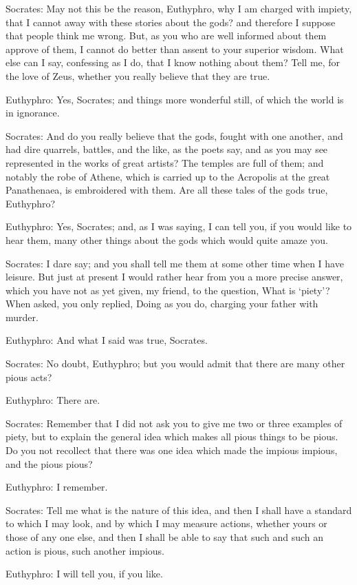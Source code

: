 Socrates: May not this be the reason, Euthyphro, why I am charged with impiety, that I cannot away with these stories about the gods? and therefore I suppose that people think me wrong. But, as you who are well informed about them approve of them, I cannot do better than assent to your superior wisdom. What else can I say, confessing as I do, that I know nothing about them? Tell me, for the love of Zeus, whether you really believe that they are true.

Euthyphro: Yes, Socrates; and things more wonderful still, of which the world is in ignorance.

Socrates: And do you really believe that the gods, fought with one another, and had dire quarrels, battles, and the like, as the poets say, and as you may see represented in the works of great artists? The temples are full of them; and notably the robe of Athene, which is carried up to the Acropolis at the great Panathenaea, is embroidered with them. Are all these tales of the gods true, Euthyphro?

Euthyphro: Yes, Socrates; and, as I was saying, I can tell you, if you would like to hear them, many other things about the gods which would quite amaze you.

Socrates: I dare say; and you shall tell me them at some other time when I have leisure. But just at present I would rather hear from you a more precise answer, which you have not as yet given, my friend, to the question, What is `piety'? When asked, you only replied, Doing as you do, charging your father with murder.

Euthyphro: And what I said was true, Socrates.

Socrates: No doubt, Euthyphro; but you would admit that there are many other pious acts?

Euthyphro: There are.

Socrates: Remember that I did not ask you to give me two or three examples of piety, but to explain the general idea which makes all pious things to be pious. Do you not recollect that there was one idea which made the impious impious, and the pious pious?

Euthyphro: I remember.

Socrates: Tell me what is the nature of this idea, and then I shall have a standard to which I may look, and by which I may measure actions, whether yours or those of any one else, and then I shall be able to say that such and such an action is pious, such another impious.

Euthyphro: I will tell you, if you like.

